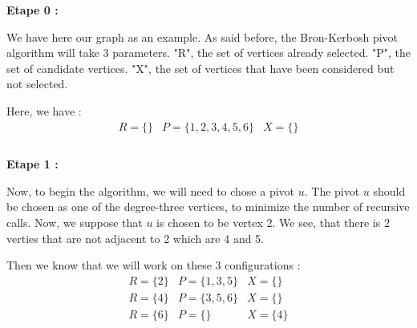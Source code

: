     \hspace*{1cm} \textbf{Etape 0 :}
    \\
    \begin{minipage}{0.4\textwidth}
    \end{minipage}
    \begin{minipage}{0.6\textwidth}
        We have here our graph as an example. As said before, the Bron-Kerbosh pivot algorithm will take 3 parameters. "R", the set of vertices already selected. "P", the set of candidate vertices. "X", the set of vertices that have been considered but not selected.
    \end{minipage}
    Here, we have :
    $$ \boxed{
            \begin{array}{lll}
                R = \{\} & P = \{1,2,3,4,5,6\} & X = \{\} \\
            \end{array}
    }$$
    \\ 
    \hspace*{1cm}  \textbf{Etape 1 :}
    \\
    \begin{minipage}{0.4\textwidth}
    \end{minipage}
    \begin{minipage}{0.6\textwidth}
        Now, to begin the algorithm, we will need to chose a pivot $u$. The pivot $u$ should be chosen as one of the degree-three vertices, to minimize the number of recursive calls. Now, we suppose that $u$ is chosen to be vertex 2. We see, that there is 2 verties that are not adjacent to 2 which are 4 and 5.
    \end{minipage}
    Then we know that we will work on these 3 configurations  :
        $$ \boxed{
            \begin{array}{lll}
                R = \{2\} & P = \{1,3,5\} & X = \{\} \\
                R = \{4\} & P = \{3,5,6\} & X = \{\} \\
                R = \{6\} & P = \{\} & X = \{4\} \\
            \end{array}
        }$$

